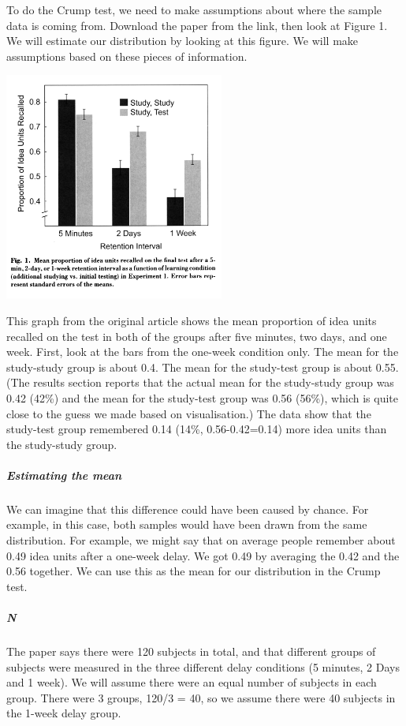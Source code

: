 \documentclass[
]{book}
\begin{document}
To do the Crump test, we need to make assumptions about where the sample data is coming from. Download the paper from the link, then look at Figure 1. We will estimate our distribution by looking at this figure. We will make assumptions based on these pieces of information.

\includegraphics{img/ch5/5.3.4.1articlefigure1.png}

This graph from the original article shows the mean proportion of idea units recalled on the test in both of the groups after five minutes, two days, and one week. First, look at the bars from the one-week condition only. The mean for the study-study group is about 0.4. The mean for the study-test group is about 0.55. (The results section reports that the actual mean for the study-study group was 0.42 (42\%) and the mean for the study-test group was 0.56 (56\%), which is quite close to the guess we made based on visualisation.) The data show that the study-test group remembered 0.14 (14\%, 0.56-0.42=0.14) more idea units than the study-study group.

\hypertarget{estimating-the-mean}{%
\subparagraph{Estimating the mean}\label{estimating-the-mean}}

We can imagine that this difference could have been caused by chance. For example, in this case, both samples would have been drawn from the same distribution. For example, we might say that on average people remember about 0.49 idea units after a one-week delay. We got 0.49 by averaging the 0.42 and the 0.56 together. We can use this as the mean for our distribution in the Crump test.

\hypertarget{n}{%
\subparagraph{N}\label{n}}

The paper says there were 120 subjects in total, and that different groups of subjects were measured in the three different delay conditions (5 minutes, 2 Days and 1 week). We will assume there were an equal number of subjects in each group. There were 3 groups, 120/3 = 40, so we assume there were 40 subjects in the 1-week delay group.
\end{document}
